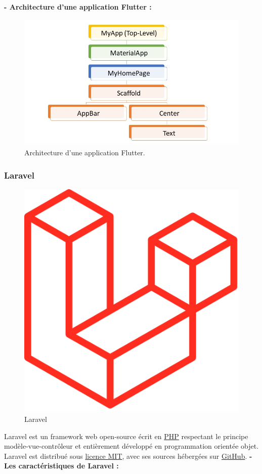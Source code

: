 \textbf {- Architecture d’une application Flutter :} 
\begin{figure}[h!]
	\includegraphics[width=450px,height=250px]{./Template LaTeX/Images/Flutter_architect.png}
	\caption{Architecture d’une application Flutter.}
	\label{fig:birds}
\end{figure}
\newpage
\subsubsection{Laravel}
\begin{figure}[h]
	\includegraphics[scale=0.2]{./Template LaTeX/Images/462px-Laravel.svg.png}
	\centering
	\caption{Laravel}
\end{figure}
Laravel est un framework web open-source écrit en  \href{https://fr.wikipedia.org/wiki/PHP}{PHP} respectant le principe modèle-vue-contrôleur et entièrement développé en programmation orientée objet. Laravel est distribué sous \href{https://fr.wikipedia.org/wiki/Licence_MIT}{licence MIT}, avec ses sources hébergées sur 
\href{https://fr.wikipedia.org/wiki/GitHub}{GitHub}.\newline\newline
\textbf {- Les caractéristiques de Laravel :}

